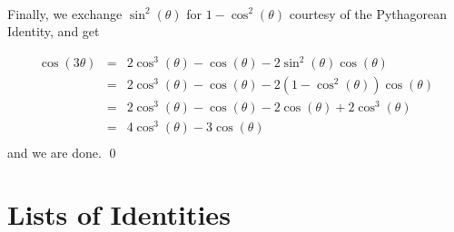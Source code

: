 \documentclass{ximera}
\begin{document}
\begin{example}
\begin{enumerate}
\[\begin{array}{rcl}
\end{array}\]

Finally, we exchange $\sin^{2}(\theta)$ for $1 - \cos^{2}(\theta)$ courtesy of the Pythagorean Identity, and get

\[ \begin{array}{rcl}

\cos(3\theta) & = & 2\cos^{3}(\theta)- \cos(\theta) - 2 \sin^2(\theta) \cos(\theta) \\ [2pt]
              & = & 2\cos^{3}(\theta)- \cos(\theta) - 2 \left(1 - \cos^{2}(\theta)\right) \cos(\theta) \\ [2pt]
              & = & 2\cos^{3}(\theta)- \cos(\theta) - 2\cos(\theta) + 2\cos^{3}(\theta) \\ [2pt]
              & = & 4\cos^{3}(\theta)- 3\cos(\theta) \\
\end{array}\]        
 and we are done.  \qed           
              
\end{enumerate}

\end{example}

\section{Lists of Identities}
\end{document}
